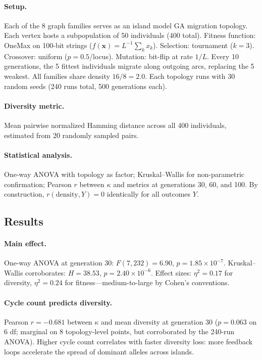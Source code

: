 \documentclass[10pt,twocolumn]{article}
\begin{document}
\paragraph{Setup.}
Each of the 8 graph families serves as an island model GA migration
topology. Each vertex hosts a subpopulation of 50 individuals (400 total).
Fitness function: OneMax on 100-bit strings ($f(\mathbf{x}) =
L^{-1}\sum_k x_k$). Selection: tournament ($k=3$). Crossover: uniform
($p = 0.5$/locus). Mutation: bit-flip at rate $1/L$. Every 10 generations,
the 5 fittest individuals migrate along outgoing arcs, replacing the 5
weakest. All families share density $16/8 = 2.0$. Each topology runs with
30 random seeds (240 runs total, 500 generations each).

\paragraph{Diversity metric.}
Mean pairwise normalized Hamming distance across all 400 individuals,
estimated from 20 randomly sampled pairs.

\paragraph{Statistical analysis.}
One-way ANOVA with topology as factor; Kruskal--Wallis for non-parametric
confirmation; Pearson $r$ between $\kappa$ and metrics at generations 30,
60, and 100. By construction, $r(\text{density}, Y) = 0$ identically for
all outcomes $Y$.

\subsection{Results}

\paragraph{Main effect.}
One-way ANOVA at generation 30: $F(7, 232) = 6.90$, $p = 1.85 \times
10^{-7}$. Kruskal--Wallis corroborates: $H = 38.53$, $p = 2.40 \times
10^{-6}$. Effect sizes: $\eta^2 = 0.17$ for diversity, $\eta^2 = 0.24$
for fitness---medium-to-large by Cohen's conventions.

\paragraph{Cycle count predicts diversity.}
Pearson $r = -0.681$ between $\kappa$ and mean diversity at generation 30
($p = 0.063$ on 6 df; marginal on 8 topology-level points, but
corroborated by the 240-run ANOVA). Higher cycle count correlates with
faster diversity loss: more feedback loops accelerate the spread of
dominant alleles across islands.
\end{document}
